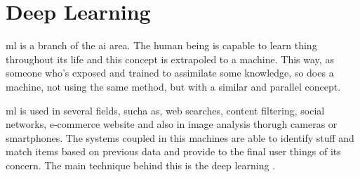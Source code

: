 \section{Deep Learning}\label{sec:deep_learning}

\gls*{ml} is a branch of the \gls*{ai} area. The human being is capable to learn thing throughout its life and this concept is extrapoled to a machine. This way, as someone who's exposed and trained to assimilate some knowledge, so does a machine, not using the same method, but with a similar and parallel concept.

\gls*{ml} is used in several fields, sucha as, web searches, content filtering, social networks, e-commerce website and also in image analysis thorugh cameras or smartphones. The systems coupled in this machines are able to identify stuff and match items based on previous data and provide to the final user things of its concern. The main technique behind this is the deep learning \citep{lecun_deep_2015}. 